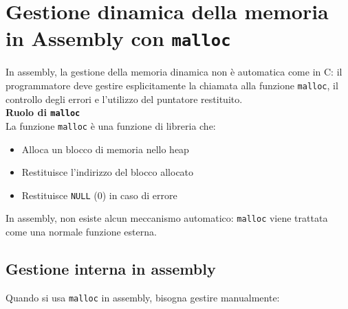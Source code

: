 \section{Gestione dinamica della memoria in Assembly con \texttt{malloc}}
\noindent In assembly, la gestione della memoria dinamica non è automatica come in C: 
il programmatore deve gestire esplicitamente la chiamata alla funzione \texttt{malloc}, 
il controllo degli errori e l'utilizzo del puntatore restituito.\\
\textbf{Ruolo di \texttt{malloc}}\\
La funzione \texttt{malloc} è una funzione di libreria che:
\begin{itemize}
    \item Alloca un blocco di memoria nello heap
    \item Restituisce l'indirizzo del blocco allocato
    \item Restituisce \texttt{NULL} (0) in caso di errore
\end{itemize}
\noindent In assembly, non esiste alcun meccanismo automatico: 
\texttt{malloc} viene trattata come una normale funzione esterna.
\subsection{Gestione interna in assembly}
Quando si usa \texttt{malloc} in assembly, bisogna gestire manualmente:

